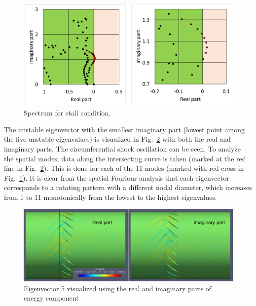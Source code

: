 \documentclass[journal,final]{new-aiaa}
\begin{document}
\begin{figure}[htb]
	\centering   
	\includegraphics[width=.7\textwidth]{pic/rotor67-18kpa-spectrum.png}	
	\caption{Spectrum for stall condition.}
	\label{fig:r67-eigenvalue-18kpa}
\end{figure}

The unstable eigenvector with the smallest imaginary part (lowest point among the
five unstable eigenvalues) is visualized in Fig.~\ref{fig:r67-eigenvector-18kpa} with
both the real and imaginary parts. The circumferential shock
oscillation can be seen. To analyze the spatial modes, data along
the intersecting curve is taken (marked at the red line in
Fig.~\ref{fig:r67-eigenvector-18kpa}). This is done for
each of the 11 modes (marked with red cross in Fig.~\ref{fig:r67-eigenvalue-18kpa}). It is clear from the spatial Fouriour analysis
that each eigenvector corresponds to a rotating pattern with a different
nodal diameter, which increases from 1 to 11 monotonically from the lowest
to the highest eigenvalues.

\begin{figure}[htb]
	\centering   
	\includegraphics[width=.6\textwidth]{pic/mode-with-nd5.png}
	\caption{Eigenvector 5 visualized using the real and imaginary parts
		of energy component}
	\label{fig:r67-eigenvector-18kpa}
\end{figure}

\end{document}
